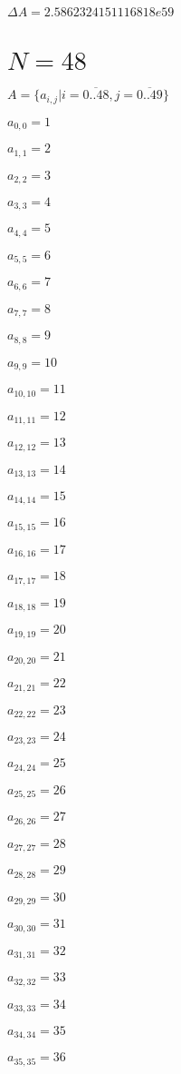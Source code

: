 \documentclass[a4paper,12pt]{article}
\begin{document}
$\Delta A = 2.5862324151116818e59$



\section{ $N = 48$ }
$A = \{ a _{ i, j } | i = \overline { 0..48 }, j = \overline { 0..49 } \}$

$a _{ 0, 0 } = 1$

$a _{ 1, 1 } = 2$

$a _{ 2, 2 } = 3$

$a _{ 3, 3 } = 4$

$a _{ 4, 4 } = 5$

$a _{ 5, 5 } = 6$

$a _{ 6, 6 } = 7$

$a _{ 7, 7 } = 8$

$a _{ 8, 8 } = 9$

$a _{ 9, 9 } = 10$

$a _{ 10, 10 } = 11$

$a _{ 11, 11 } = 12$

$a _{ 12, 12 } = 13$

$a _{ 13, 13 } = 14$

$a _{ 14, 14 } = 15$

$a _{ 15, 15 } = 16$

$a _{ 16, 16 } = 17$

$a _{ 17, 17 } = 18$

$a _{ 18, 18 } = 19$

$a _{ 19, 19 } = 20$

$a _{ 20, 20 } = 21$

$a _{ 21, 21 } = 22$

$a _{ 22, 22 } = 23$

$a _{ 23, 23 } = 24$

$a _{ 24, 24 } = 25$

$a _{ 25, 25 } = 26$

$a _{ 26, 26 } = 27$

$a _{ 27, 27 } = 28$

$a _{ 28, 28 } = 29$

$a _{ 29, 29 } = 30$

$a _{ 30, 30 } = 31$

$a _{ 31, 31 } = 32$

$a _{ 32, 32 } = 33$

$a _{ 33, 33 } = 34$

$a _{ 34, 34 } = 35$

$a _{ 35, 35 } = 36$
\end{document}
